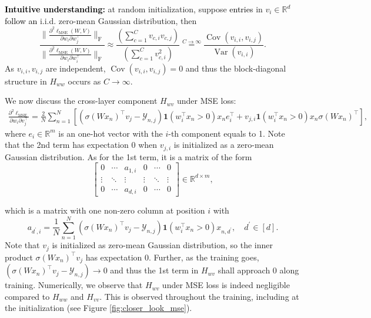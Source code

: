 \documentclass{article}
\newcommand\mf{\mathbf}
\newcommand{\1}{^{(1)}}
\newcommand{\2}{^{(2)}}
\renewcommand{\l}{\left}
\renewcommand{\r}{\right}
\newcommand{\bea}{\begin{equation}\begin{aligned}}
\newcommand{\eea}{\end{aligned}\end{equation}}
\newcommand{\zhaoruirevise}[1]{\textcolor{black}{ #1}}
\begin{document}
\begin{snugshade}
{\bf \zhaoruirevise{Intuitive understanding}:} at random initialization, suppose \zhaoruirevise{entries} in $v_i \in \mathbb{R}^d$ \zhaoruirevise{follow an} i.i.d. zero-mean Gaussian distribution, then
\begin{equation}
    \frac{\bigg\|    \frac{\partial^2\ell_{\text{MSE}}(W,V)}{\partial w_i  \partial w_j^\top}
 \bigg\|_{\operatorname{F}}}{\bigg\|  \frac{\partial^2\ell_{\text{MSE}}(W,V)}{\partial w_i  \partial w_i^\top} \bigg\|_{\operatorname{F}}
}
  \approx \frac{\left(\sum_{c= 1}^C v_{c,i} v_{c,j} \right)  } {   \left(\sum_{c= 1}^C v_{c,i}^2 \right) } \overset{C \rightarrow \infty}{=} \frac{\operatorname{Cov}(v_{i,i},v_{i,j}) }{ \operatorname{Var}(v_{i,i})}.
\end{equation}
As $v_{i,i},v_{i,j}$ are independent, $\operatorname{Cov}(v_{i,i},v_{i,j}) = 0$ and thus the block-diagonal structure in $H_{ww}$ occurs as $C \rightarrow \infty$.
\vspace{-0.2cm}
\end{snugshade}

We now discuss the cross-layer component  $H_{wv}$ under MSE loss:
\bea
\frac{\partial^2 \ell_{\text{MSE}}}{\partial w_i\partial v_j^\top }=\frac{2}{N}\sum_{n=1}^N\l[    \left(  \sigma(Wx_n)^\top v_j - \mathcal{Y}_{n,j}  \right)  \mf{1}
(w_i^\top x_n>0)x_n e_i^\top + v_{j,i} \mf{1}
(w_i^\top x_n>0)x_n \sigma(Wx_n)^\top   \r],
\eea
where $e_i \in \mathbb{R}^m$ is an one-hot vector with the $i$-th component equals to 1. Note that the 2nd term has expectation 0 when $v_{j,i}$ is initialized as a zero-mean Gaussian distribution. As for the 1st term, it is a matrix of the form
\begin{equation}
\label{eq_hwv}
    \left[\begin{array}{cccccc}
0 & \cdots & a_{1, i} & 0 & \cdots & 0 \\
\vdots & \ddots & \vdots & \vdots & \ddots & \vdots \\
0 & \cdots & a_{d, i} & 0 & \cdots & 0
\end{array}\right] \in \mathbb{R}^{d \times m},
\end{equation}

which is a matrix with one non-zero column at position $i$ with {\small $$a_{d^\prime, i}=\frac{1}{N} \sum_{n=1}^N  \left(  \sigma(Wx_n)^\top v_j - \mathcal{Y}_{n,j}  \right)  \mf{1}
(w_i^\top x_n>0)x_{n,d^\prime},\quad   d^\prime \in [d].$$}   
Note that $v_{j}$ is initialized as zero-mean Gaussian distribution, so the inner product  $ \sigma(Wx_n)^\top v_j$ has expectation 0. Further,  as the training goes,   {\small $ \left(  \sigma(Wx_n)^\top v_j - \mathcal{Y}_{n,j}  \right) \rightarrow 0$} and thus the 1st  term in $H_{wv}$ shall approach 0 along training.  Numerically, we observe that $H_{wv}$ under MSE loss is indeed negligible compared to $H_{ww}$ and $H_{vv}$. This is observed throughout the training, including at the initialization (see Figure \ref{fig:closer_look_mse}). 
\end{document}
